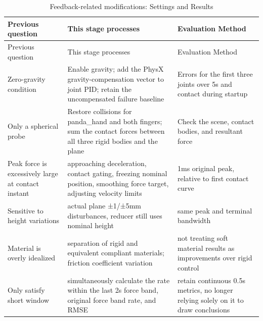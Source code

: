 \FloatBarrier\begingroup\small\setlength{\tabcolsep}{2.5pt}
\begin{longtable}[]{@{}
  >{\raggedright\arraybackslash}p{}
  >{\raggedright\arraybackslash}p{}
  >{\raggedright\arraybackslash}p{}@{}}
\caption{Feedback-related modifications: Settings and Results}\label{tab:s13-1}\tabularnewline
\toprule\noalign{}
\begin{minipage}[b]{\linewidth}\raggedright
Previous question
\end{minipage} & \begin{minipage}[b]{\linewidth}\raggedright
This stage processes
\end{minipage} & \begin{minipage}[b]{\linewidth}\raggedright
Evaluation Method
\end{minipage} \\
\midrule\noalign{}
\endfirsthead
\toprule\noalign{}
\begin{minipage}[b]{\linewidth}\raggedright
Previous question
\end{minipage} & \begin{minipage}[b]{\linewidth}\raggedright
This stage processes
\end{minipage} & \begin{minipage}[b]{\linewidth}\raggedright
Evaluation Method
\end{minipage} \\
\midrule\noalign{}
\endhead
\bottomrule\noalign{}
\endlastfoot
Zero-gravity condition & Enable gravity; add the PhysX gravity-compensation vector to joint PID; retain the uncompensated failure baseline & Errors for the first three joints over 5s and contact during startup \\
Only a spherical probe & Restore collisions for panda\_hand and both fingers; sum the contact forces between all three rigid bodies and the plane & Check the scene, contact bodies, and resultant force \\
Peak force is excessively large at contact instant & approaching deceleration, contact gating, freezing nominal position, smoothing force target, adjusting velocity limits & 1ms original peak, relative to first contact curve \\
Sensitive to height variations & actual plane ±1/±5mm disturbances, reducer still uses nominal height & same peak and terminal bandwidth \\
Material is overly idealized & separation of rigid and equivalent compliant materials; friction coefficient variation & not treating soft material results as improvements over rigid control \\
Only satisfy short window & simultaneously calculate the rate within the last 2s force band, original force band rate, and RMSE & retain continuous 0.5s metrics, no longer relying solely on it to draw conclusions \\
\end{longtable}\endgroup

